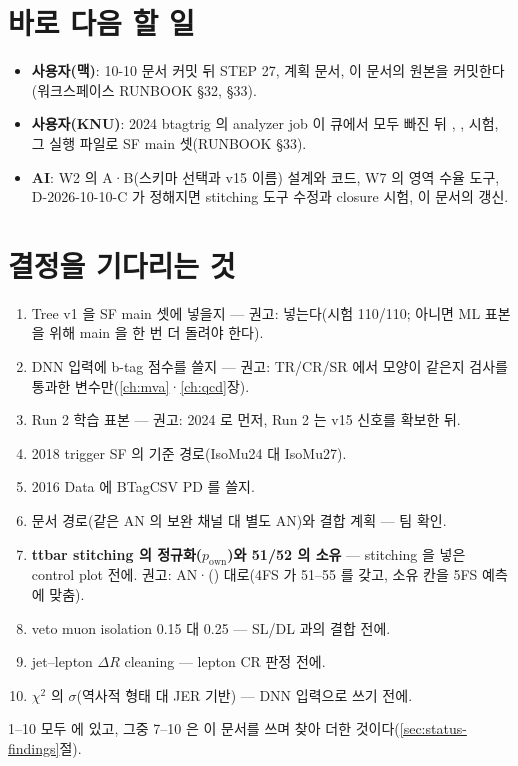 \section{바로 다음 할 일}\label{sec:plan-next}

\begin{itemize}
\item \textbf{사용자(맥)}: 10-10 문서 커밋 뒤 STEP 27, 계획 문서, 이 문서의 원본을 커밋한다(워크스페이스 RUNBOOK §32, §33).
\item \textbf{사용자(KNU)}: 2024 btagtrig 의 analyzer job 이 큐에서 모두 빠진 뒤 , , 시험,
그 실행 파일로 SF main 셋(RUNBOOK §33).
\item \textbf{AI}: W2 의 A·B(스키마 선택과 v15 이름) 설계와 코드, W7 의 영역 수율 도구, D-2026-10-10-C 가 정해지면 stitching 도구 수정과 closure 시험,
이 문서의 갱신.
\end{itemize}

\section{결정을 기다리는 것}\label{sec:plan-open}

\begin{openq}[결정 대기(2026-10-10; 권고는 AI)]
\begin{enumerate}[leftmargin=*]
\item Tree v1 을 SF main 셋에 넣을지 — 권고: 넣는다(시험 110/110; 아니면 ML 표본을 위해 main 을 한 번 더 돌려야 한다).
\item DNN 입력에 b-tag 점수를 쓸지 — 권고: TR/CR/SR 에서 모양이 같은지 검사를 통과한 변수만(\ref{ch:mva}·\ref{ch:qcd}장).
\item Run 2 학습 표본 — 권고: 2024 로 먼저, Run 2 는 v15 신호를 확보한 뒤.
\item 2018 trigger SF 의 기준 경로(IsoMu24 대 IsoMu27).
\item 2016 Data 에 BTagCSV PD 를 쓸지.
\item 문서 경로(같은 AN 의 보완 채널 대 별도 AN)와 결합 계획 — 팀 확인.
\item \textbf{ttbar stitching 의 정규화($p_{\text{own}}$)와 51/52 의 소유} — stitching 을 넣은 control plot 전에.
권고: AN·\ttH(\bbbar) 대로(4FS 가 51–55 를 갖고, 소유 칸을 5FS 예측에 맞춤).
\item veto muon isolation 0.15 대 0.25 — SL/DL 과의 결합 전에.
\item jet–lepton $\Delta R$ cleaning — lepton CR 판정 전에.
\item $\chi^2$ 의 $\sigma$(역사적 형태 대 JER 기반) — DNN 입력으로 쓰기 전에.
\end{enumerate}
1–10 모두  에 있고, 그중 7–10 은 이 문서를 쓰며 찾아 더한 것이다(\ref{sec:status-findings}절).
\end{openq}

